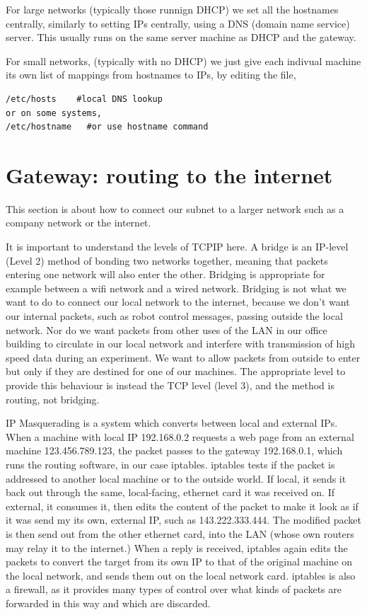 \documentclass[oneside,english]{scrbook}
\begin{document}
For large networks (typically those runnign DHCP) we set all the hostnames centrally, similarly to setting IPs centrally, using a DNS (domain name service) server. This usually runs on the same server machine as DHCP and the gateway.

For small networks, (typically with no DHCP) we just give each indivual machine its own list of mappings from hostnames to IPs, by editing the file,
\begin{lstlisting}
/etc/hosts    #local DNS lookup 
or on some systems,
/etc/hostname   #or use hostname command 
\end{lstlisting}
  

\section{Gateway: routing to the internet}

This section is about how to connect our subnet to a larger network such as a company network or the internet. 

It is important to understand the levels of TCPIP here. A bridge is
an IP-level (Level 2) method of bonding two networks together, meaning that packets
entering one network will also enter the other. Bridging is appropriate
for example between a wifi network and a wired network. Bridging is
not what we want to do to connect our local network to the internet,
because we don't want our internal packets, such as robot control
messages, passing outside the local network. Nor do we want packets
from other uses of the LAN in our office building to circulate in
our local network and interfere with  transmission of high speed data
during an experiment. We want to allow packets from outside to enter
but only if they are destined for one of our machines. The appropriate
level to provide this behaviour is instead the TCP level (level 3), and the method
is routing, not bridging.

IP Masquerading is a system which converts between local and external
IPs. When a machine with local IP 192.168.0.2 requests a web page
from an external machine 123.456.789.123, the packet passes to the
gateway 192.168.0.1, which runs the routing software, in our case
iptables. iptables tests if the packet is addressed to another local
machine or to the outside world. If local, it sends it back out through
the same, local-facing, ethernet card it was received on. If external,
it consumes it, then edits the content of the packet to make it look
as if it was send my its own, external IP, such as 143.222.333.444.
The modified packet is then send out from the other ethernet card,
into the LAN (whose own routers may relay it to the internet.) When
a reply is received, iptables again edits the packets to convert the
target from its own IP to that of the original machine on the local
network, and sends them out on the local network card. iptables is
also a firewall, as it provides many types of control over what kinds
of packets are forwarded in this way and which are discarded.
\end{document}
